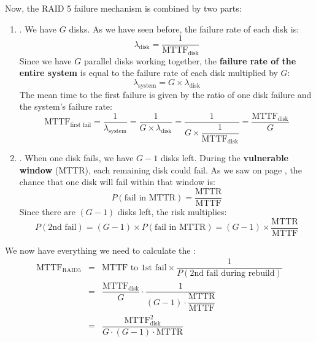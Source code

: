 \noindent
Now, the RAID 5 failure mechanism is combined by two parts:
\begin{enumerate}
    \item {}. We have $G$ disks. As we have seen before, the failure rate of each disk is:
    \begin{equation*}
        \lambda_{\text{disk}} = \dfrac{1}{\text{MTTF}_{\text{disk}}}
    \end{equation*}
    Since we have $G$ parallel disks working together, the \textbf{failure rate of the entire system} is equal to the failure rate of each disk multiplied by $G$:
    \begin{equation*}
        \lambda_{\text{system}} = G \times \lambda_{\text{disk}}
    \end{equation*}
    The mean time to the first failure is given by the ratio of one disk failure and the system's failure rate:
    \begin{equation*}
        \text{MTTF}_{\text{first fail}} = \dfrac{1}{\lambda_{\text{system}}} = \dfrac{1}{G \times \lambda_{\text{disk}}} = \dfrac{1}{G \times \dfrac{1}{\text{MTTF}_{\text{disk}}}} = \dfrac{\text{MTTF}_{\text{disk}}}{G}
    \end{equation*}
    \item {}. When one disk fails, we have $G-1$ disks left. During the \textbf{vulnerable window} (MTTR), each remaining disk could fail. As we saw on page \pageref{eq: RAID 5 - probability that a disk fails in a small time}, the chance that one disk will fail within that window is:
    \begin{equation*}
        P(\text{fail in MTTR}) = \dfrac{\text{MTTR}}{\text{MTTF}}
    \end{equation*}
    Since there are $(G-1)$ disks left, the risk multiplies:
    \begin{equation*}
        P\left(\text{2nd fail}\right) = \left(G-1\right) \times P(\text{fail in MTTR}) = \left(G-1\right) \times \dfrac{\text{MTTR}}{\text{MTTF}}
    \end{equation*}
\end{enumerate}
We now have everything we need to calculate the :
\begin{equation}\label{eq: RAID 5 - MTTF}
    \begin{array}{rcl}
        \text{MTTF}_{\text{RAID5}} &=& \text{MTTF to 1st fail}
        \times
        \dfrac{1}{P(\text{2nd fail during rebuild})} \\ [1.8em]
        &=& \dfrac{\text{MTTF}_{\text{disk}}}{G}
        \cdot
        \dfrac{1}{
            \left(G-1\right) \cdot \dfrac{\text{MTTR}}{\text{MTTF}}
        } \\ [2em]
        &=& \dfrac{
            \text{MTTF}_\text{disk}^{2}
        }{
            G \cdot \left(G-1\right) \cdot \text{MTTR}
        }
    \end{array}
\end{equation}

